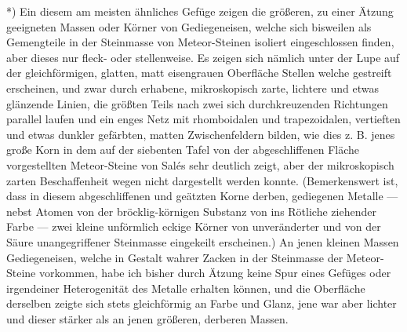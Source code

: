 \documentclass[a4paper, 11pt, oneside, german]{article}
\begin{document}
*) Ein diesem am meisten ähnliches Gefüge zeigen die größeren, zu einer Ätzung geeigneten Massen oder Körner von Gediegeneisen, welche sich bisweilen als Gemengteile in der Steinmasse von Meteor-Steinen isoliert eingeschlossen finden, aber dieses nur fleck- oder stellenweise. Es zeigen sich nämlich unter der Lupe auf der gleichförmigen, glatten, matt eisengrauen Oberfläche Stellen welche gestreift erscheinen, und zwar durch erhabene, mikroskopisch zarte, lichtere und etwas glänzende Linien, die größten Teils nach zwei sich durchkreuzenden Richtungen parallel laufen und ein enges Netz mit rhomboidalen und trapezoidalen, vertieften und etwas dunkler gefärbten, matten Zwischenfeldern bilden, wie dies z. B. jenes große Korn in dem auf der siebenten Tafel von der abgeschliffenen Fläche vorgestellten Meteor-Steine von Salés sehr deutlich zeigt, aber der mikroskopisch zarten Beschaffenheit wegen nicht dargestellt werden konnte. (Bemerkenswert ist, dass in diesem abgeschliffenen und geätzten Korne derben, gediegenen Metalle --- nebst Atomen von der bröcklig-körnigen Substanz von ins Rötliche ziehender Farbe --- zwei kleine unförmlich eckige Körner von unveränderter und von der Säure unangegriffener Steinmasse eingekeilt erscheinen.) An jenen kleinen Massen Gediegeneisen, welche in Gestalt wahrer Zacken in der Steinmasse der Meteor-Steine vorkommen, habe ich bisher durch Ätzung keine Spur eines Gefüges oder irgendeiner Heterogenität des Metalle erhalten können, und die Oberfläche derselben zeigte sich stets gleichförmig an Farbe und Glanz, jene war aber lichter und dieser stärker als an jenen größeren, derberen Massen.  
\end{document}
